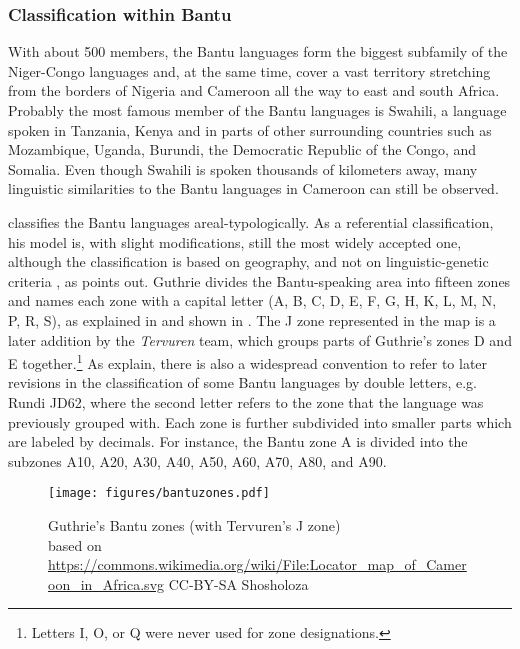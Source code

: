 \subsubsection*{Classification within Bantu} With about 500 members, the Bantu languages form the biggest subfamily of the Niger-Congo languages and, at the same time, cover a vast territory stretching from the borders of Nigeria and Cameroon all the way to east and south Africa. Probably the most famous member of the Bantu languages is Swahili, a language spoken in Tanzania, Kenya and in parts of other surrounding countries such as Mozambique, Uganda, Burundi, the Democratic Republic of the Congo, and Somalia. Even though Swahili is spoken thousands of kilometers away, many linguistic similarities to the Bantu languages in Cameroon can still be observed.

\citet{guthrie71} classifies the Bantu languages areal-typologically. As a referential classification, his model is, with slight modifications, still the most widely accepted one, although the classification is based on geography, and not on linguis\-tic-genetic criteria%
, as \citet[46]{maho2001} points out. %
Guthrie divides the Bantu-speaking area into fifteen zones and names each zone with a capital letter (A, B, C, D, E, F, G, H, K, L, M, N, P, R, S), as explained in \citet[3]{nurse03} and shown in . The J zone represented in the map is a later addition by the {\itshape Tervuren} team, which groups parts of Guthrie's zones D and E together.\footnote{Letters I, O, or Q were never used for zone designations.} As \citet[337]{philippson2019} explain, there is also a widespread convention to refer to later revisions in the classification of some Bantu languages by double letters, e.g. Rundi JD62, where the second letter refers to the zone that the language was previously grouped with.
Each zone is further subdivided into smaller parts which are labeled by decimals. For instance, the Bantu zone A is divided into the subzones A10, A20, A30, A40, A50, A60, A70, A80, and A90.
\begin{figure}

\texttt{[image: figures/bantuzones.pdf]}
\caption{Guthrie's Bantu zones (with Tervuren's J zone)\\{\tiny based on \url{https://commons.wikimedia.org/wiki/File:Locator_map_of_Cameroon_in_Africa.svg} CC-BY-SA Shosholoza }}
\label{Fig:Bantu-zones}
\end{figure}




